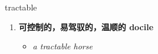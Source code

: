 
\begin{frame}
{\huge tractable}
\begin{center}
\begin{enumerate}\Large
  \item \textbf{可控制的，易驾驭的，温顺的 docile}
  \begin{itemize}
    \item \em{\Large{a tractable horse}}
  \end{itemize}
\end{enumerate}
\end{center}
\end{frame}
